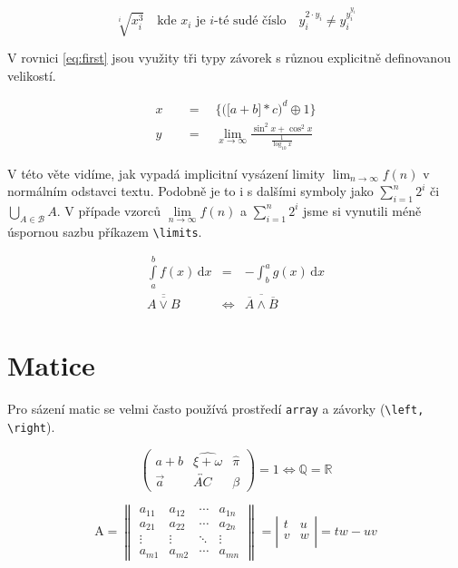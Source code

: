 \documentclass [11pt, a4paper]{article}
\begin{document}
\begin{twocolumn}
$$\sqrt[i]{x^3_i} \quad\text{kde } x_i \text{ je } i \text{-té sudé číslo}\quad  y_i^{2\cdot y_i} \neq y_i^{y_i^{y_i}}$$

V rovnici \eqref{eq:first} jsou využity tři typy závorek s různou explicitně definovanou velikostí.

\begin{align}
\label{eq:first}
x \quad&= \quad\bigg\{\Big(\big[a + b\big]*c\Big)^d\oplus1\bigg\}\\
y \quad&= \quad\lim_{x\to\infty}\frac{\sin^2x + \cos^2x}{\frac{1}{\log_{10}x}} \nonumber
\end{align}

V této věte vidíme, jak vypadá implicitní vysázení limity $\lim_{n\to\infty} f(n)$ v normálním odstavci textu. Podobně je to i s dalšími symboly jako $\sum_{i=1}^n 2^i$ či $\bigcup_{A\in\mathcal{B}}A$. V případe vzorců $\lim\limits_{n\to\infty} f(n)$ a $\sum\limits_{i=1}^n 2^i$ jsme si vynutili méně úspornou sazbu příkazem \texttt{\textbackslash limits}.

\begin{eqnarray}
\int\limits_a^b f(x)\,\mathrm{d}x &=& - \int_b^a g(x)\,\mathrm{d}x\\
\overline{\overline{A\vee B}} &\Leftrightarrow& \overline{\overline{A}\wedge \overline{B}}
\end{eqnarray}
\section{Matice}
Pro sázení matic se velmi často používá prostředí \texttt{array} a závorky (\texttt{\textbackslash left, \textbackslash right}).

$$\left( \begin{array}{ccc}
a + b & {\widehat {\xi + \omega}} & {\hat \pi}\\
{\vec a} & \overleftrightarrow{AC} & \beta
\end{array} \right)
= 1 \iff \mathbb{Q} = \mathbb{R}
$$

$$ 
\text{A} = \left\| \begin{array}{cccc}
a_{11} & a_{12} & \cdots & a_{1n} \\
a_{21} & a_{22} & \cdots & a_{2n} \\
\vdots & \vdots & \ddots & \vdots \\
a_{m1} & a_{m2} & \cdots & a_{mn} \end{array} \right\|
= 
\left| \begin{array}{cc}
t & u \\
v & w \\
\end{array} \right|
= tw - uv
$$



\end{twocolumn}
\end{document}
